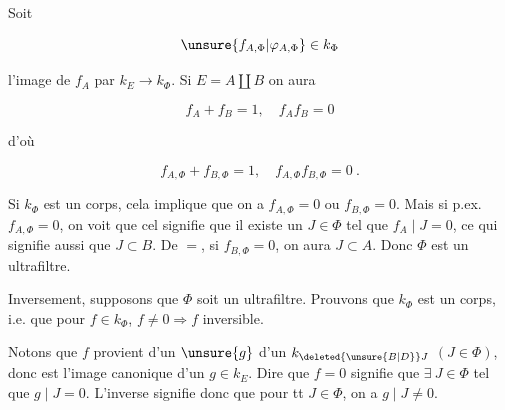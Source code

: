 

\unsure{-} Soit

\[
\unsure{f_{A,\Phi}|\varphi_{A,\Phi}}\in k_\Phi
\]

l'image de $f_A$ par  $k_E\longrightarrow k_\Phi$. Si $E=A\amalg B$ on aura

\[
f_A+f_B=1,\quad f_A f_B=0
\]

d'où

\[
f_{A,\Phi}+f_{B,\Phi}=1,\quad f_{A,\Phi}f_{B,\Phi}=0\ .
\]

Si $k_\Phi$ est un corps, cela implique que  on a $f_{A,\Phi}=0$ ou $f_{B,\Phi}=0$. Mais si p.ex. $f_{A,\Phi}=0$, on voit que cel signifie que il existe un $J\in\Phi$ tel que $f_A\mid J=0$, ce qui signifie aussi que $J\subset B$. De $=$, si $f_{B,\Phi}=0$, on aura $J\subset A$. Donc $\Phi$ est un ultrafiltre.

Inversement, supposons que $\Phi$ soit un ultrafiltre.  Prouvons que $k_\Phi$ est un corps, i.e. que pour $f\in k_\Phi$, $f\ne0\Rightarrow f$ inversible.

 Notons que $f$ provient d'un $\unsure{g}$  d'un $k_{\deleted{\unsure{B|D}}J}$ $(J\in\Phi)$, donc est l'image canonique d'un $g\in k_E$. Dire que $f=0$ signifie que $\exists\ J\in\Phi$ tel que $g\mid J=0$. L'inverse  signifie donc que pour tt $J\in\Phi$, on a $g\mid J\ne0$.

